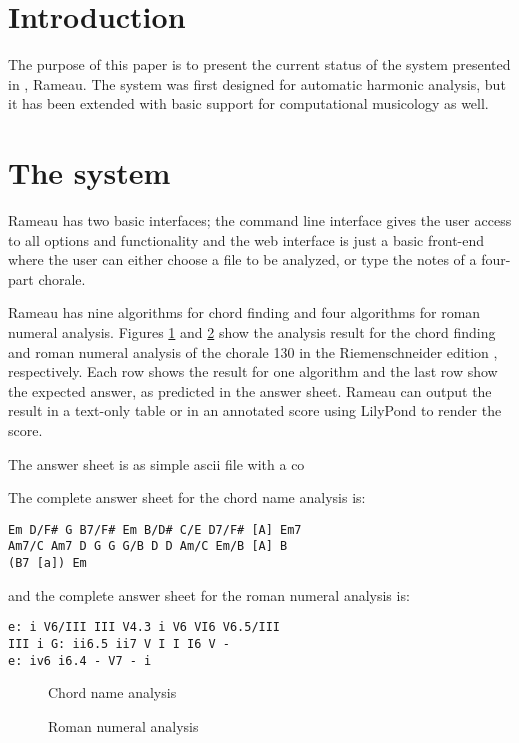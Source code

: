 \section{Introduction}

The purpose of this paper is to present the current status of the
system presented in \cite{kroger08:rameau}, Rameau. The system was
first designed for automatic harmonic analysis, but it has been
extended with basic support for computational musicology as well.

\section{The system}
\label{sec:system}

Rameau has two basic interfaces; the command line interface gives the
user access to all options and functionality and the web interface is
just a basic front-end where the user can either choose a file to be
analyzed, or type the notes of a four-part chorale.

Rameau has nine algorithms for chord finding and four algorithms for
roman numeral analysis. Figures \ref{fig:chord-name-analysis} and
\ref{fig:roman-analysis} show the analysis result for the chord
finding and roman numeral analysis of the chorale 130 in the
Riemenschneider edition \cite{bach41:371} , respectively. Each row
shows the result for one algorithm and the last row show the expected
answer, as predicted  in the answer sheet.
Rameau can output the result in a text-only table or in an annotated
score using LilyPond \cite{nienhuys.ea08:LilyPond} to render the
score.

The answer sheet is as simple ascii file with a co 

The complete answer sheet for the chord name analysis is:

\begin{verbatim}
Em D/F# G B7/F# Em B/D# C/E D7/F# [A] Em7
Am7/C Am7 D G G G/B D D Am/C Em/B [A] B 
(B7 [a]) Em
\end{verbatim}

and the complete answer sheet for the roman numeral analysis is:

\begin{verbatim}
e: i V6/III III V4.3 i V6 VI6 V6.5/III
III i G: ii6.5 ii7 V I I I6 V -
e: iv6 i6.4 - V7 - i
\end{verbatim}


\begin{figure}
  \centering
  
  \caption{Chord name analysis}
  \label{fig:chord-name-analysis}
\end{figure}
\begin{figure}
  \centering
  
  \caption{Roman numeral analysis}
  \label{fig:roman-analysis}
\end{figure}


